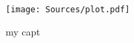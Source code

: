 \documentclass[]{article}
\begin{document}
\begin{figure}
\texttt{[image: Sources/plot.pdf]}
\caption[woo]{my capt}
\end{figure}
\end{document}
